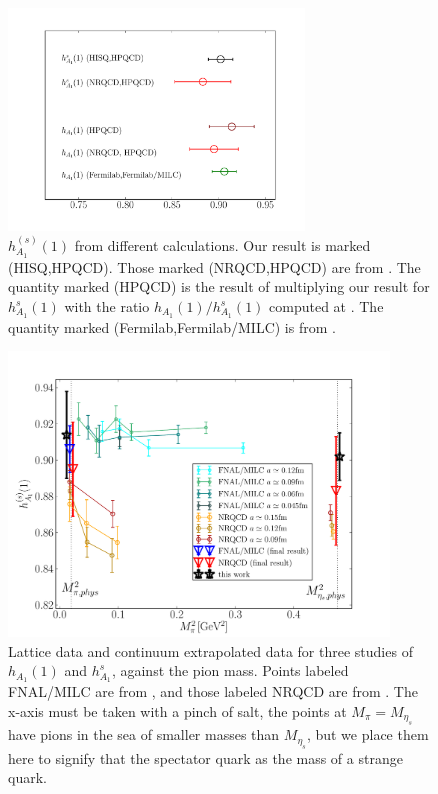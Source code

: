 \begin{figure}[htb!]
  \begin{center}
  \hspace{-20pt}
  \includegraphics[width=0.7\textwidth]{images/BsDsstar/comparisons.pdf}
  \caption{ $h_{A_1}^{(s)}(1)$ from different calculations. Our result is marked (HISQ,HPQCD). Those marked (NRQCD,HPQCD) are from \cite{Harrison:2017fmw}. The quantity marked (HPQCD) is the result of multiplying our result for $h^s_{A_1}(1)$ with the ratio $h_{A_1}(1)/h^s_{A_1}(1)$ computed at \cite{Harrison:2017fmw}. The quantity marked (Fermilab,Fermilab/MILC) is from \cite{Bailey:2014tva}. \label{fig:comparison_BsDsstar}}
  \end{center}
\end{figure}

\begin{figure}[htb!]
  \vspace{-10pt}
  \begin{center}
  \includegraphics[width=0.9\textwidth]{images/BsDsstar/fermilab_nrqcd_data.pdf}
  \caption{Lattice data and continuum extrapolated data for three studies of $h_{A_1}(1)$ and $h_{A_1}^s$, against the pion mass. Points labeled FNAL/MILC are from \cite{Bailey:2014tva}, and those labeled NRQCD are from \cite{Harrison:2017fmw}. The x-axis must be taken with a pinch of salt, the points at $M_{\pi}=M_{\eta_s}$ have pions in the sea of smaller masses than $M_{\eta_s}$, but we place them here to signify that the spectator quark as the mass of a strange quark. \label{fig:fermilab_data}}
  \end{center}
  \vspace{-20pt}
\end{figure}


